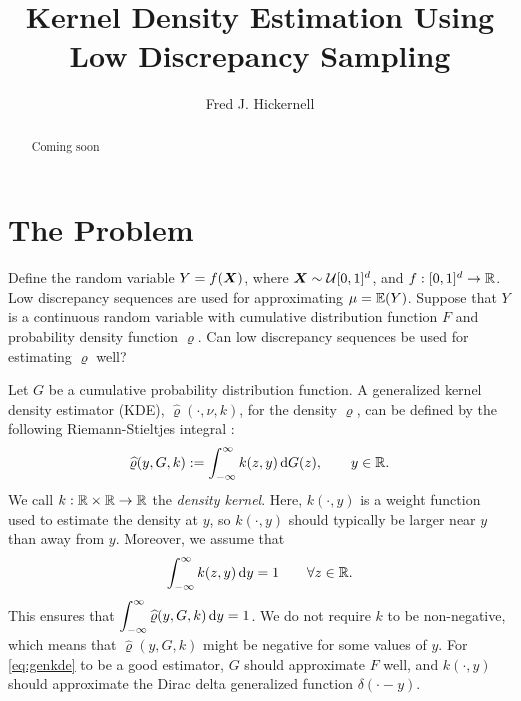 \documentclass[letterpaper]{amsart}
\newcommand{\hvarrho}{\widehat{\varrho}}
\newcommand{\AGSNote}[1]{{\color{cyan} #1}}
\newcommand{\FJHNote}[1]{{\color{blue} #1}}
\begin{document}
\title{Kernel Density Estimation Using Low Discrepancy Sampling}
\author{Fred J. Hickernell}
\begin{abstract} Coming soon
\end{abstract}

\maketitle

\section{The Problem} \label{sec:problem}

Define the random variable $Y = f(\boldsymbol{X})$, where $\boldsymbol{X} \sim \mathcal{U}[0,1]^d$, and $f:[0,1]^d \to \mathbb{R}$.  Low discrepancy sequences are used for approximating  $\mu = \operatorname{\mathbb{E}}(Y)$.  Suppose that $Y$ is a continuous random variable with cumulative distribution function $F$ and probability density function $\varrho$.  Can low discrepancy sequences be used for estimating $\varrho$ well?

Let $G$ be a cumulative probability distribution function.  A generalized kernel density estimator (KDE), $\hvarrho(\cdot,\nu,k)$, for the density $\varrho$, can be defined by the following Riemann-Stieltjes integral \cite{RSIntegral}:
\begin{equation}
	\label{eq:genkde}
\hvarrho(y,G,k) := \int_{-\infty}^{\infty} k(z,y) \, \dif G(z), \qquad y \in \reals.
\end{equation}
We call $k:\mathbb{R} \times \mathbb{R} \to \mathbb{R}$ the \emph{density kernel}. Here, $k(\cdot,y)$ is a weight function used to estimate the density at $y$, so $k(\cdot,y)$ should typically be larger near $y$ than away from $y$.   Moreover, we assume that
\begin{equation}
	\label{eq:kintegral}
	\int_{-\infty}^{\infty} k(z,y) \, {\rm d} y = 1 \qquad \forall z \in \mathbb{R}.
\end{equation}
This ensures that $\displaystyle \int_{-\infty}^{\infty} \hvarrho(y,G,k) \, \dif y = 1$.  We do not require $k$ to be non-negative, which means that $\hvarrho(y,G,k)$ might be negative for some values of $y$.
For \eqref{eq:genkde} to be a good estimator, $G$ should approximate $F$ well, and $k(\cdot,y)$ should approximate the Dirac delta generalized function $\delta(\cdot - y)$.
\end{document}

